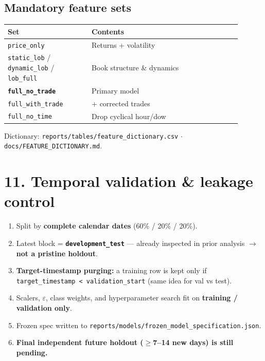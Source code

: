 \documentclass[11pt,a4paper]{article}
\begin{document}
\subsection{Mandatory feature sets}

\begin{center}
\begin{tabular}{L{0.32\linewidth}L{0.58\linewidth}}
\toprule
Set & Contents \\
\midrule
\texttt{price\_only} & Returns + volatility \\
\texttt{static\_lob} / \texttt{dynamic\_lob} / \texttt{lob\_full} & Book structure \& dynamics \\
\textbf{\texttt{full\_no\_trade}} & Primary model \\
\texttt{full\_with\_trade} & + corrected trades \\
\texttt{full\_no\_time} & Drop cyclical hour/dow \\
\bottomrule
\end{tabular}
\end{center}
\vspace{0.35em}

Dictionary: \texttt{reports/tables/feature\_dictionary.csv} $\cdot$ \texttt{docs/FEATURE\_DICTIONARY.md}.


\vspace{0.5em}

\section{11. Temporal validation \& leakage control}

\begin{enumerate}
\item Split by \textbf{complete calendar dates} (60\% / 20\% / 20\%).
\item Latest block = \textbf{\texttt{development\_test}} --- already inspected in prior analysis $\rightarrow$ \textbf{not a pristine holdout}.
\item \textbf{Target-timestamp purging:} a training row is kept only if \texttt{target\_timestamp < validation\_start} (same idea for val vs test).
\item Scalers, $\varepsilon$, class weights, and hyperparameter search fit on \textbf{training / validation only}.
\item Frozen spec written to \texttt{reports/models/frozen\_model\_specification.json}.
\item \textbf{Final independent future holdout ($\ge$7--14 new days) is still pending.}
\end{enumerate}
\end{document}
